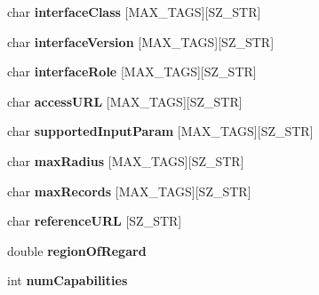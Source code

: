 \begin{CompactItemize}
\item 
\hypertarget{structVOTResource_93f36922abc2d98064ad63654ab25a7c}{
char \textbf{interfaceClass} \mbox{[}MAX\_\-TAGS\mbox{]}\mbox{[}SZ\_\-STR\mbox{]}}
\label{structVOTResource_93f36922abc2d98064ad63654ab25a7c}

\item 
\hypertarget{structVOTResource_c6d4a66929b63c1982069caf11cffca8}{
char \textbf{interfaceVersion} \mbox{[}MAX\_\-TAGS\mbox{]}\mbox{[}SZ\_\-STR\mbox{]}}
\label{structVOTResource_c6d4a66929b63c1982069caf11cffca8}

\item 
\hypertarget{structVOTResource_99676c07ab4b8f41a95337038708f368}{
char \textbf{interfaceRole} \mbox{[}MAX\_\-TAGS\mbox{]}\mbox{[}SZ\_\-STR\mbox{]}}
\label{structVOTResource_99676c07ab4b8f41a95337038708f368}

\item 
\hypertarget{structVOTResource_f41c2b3c49e891e0e3cf680f2ce9bedd}{
char \textbf{accessURL} \mbox{[}MAX\_\-TAGS\mbox{]}\mbox{[}SZ\_\-STR\mbox{]}}
\label{structVOTResource_f41c2b3c49e891e0e3cf680f2ce9bedd}

\item 
\hypertarget{structVOTResource_89b1ea26b2525910d0f2844d9abf3085}{
char \textbf{supportedInputParam} \mbox{[}MAX\_\-TAGS\mbox{]}\mbox{[}SZ\_\-STR\mbox{]}}
\label{structVOTResource_89b1ea26b2525910d0f2844d9abf3085}

\item 
\hypertarget{structVOTResource_2e0ccaca6a26587f5581c45b3db41416}{
char \textbf{maxRadius} \mbox{[}MAX\_\-TAGS\mbox{]}\mbox{[}SZ\_\-STR\mbox{]}}
\label{structVOTResource_2e0ccaca6a26587f5581c45b3db41416}

\item 
\hypertarget{structVOTResource_57f404e09b1317476d94608abc7c23b7}{
char \textbf{maxRecords} \mbox{[}MAX\_\-TAGS\mbox{]}\mbox{[}SZ\_\-STR\mbox{]}}
\label{structVOTResource_57f404e09b1317476d94608abc7c23b7}

\item 
\hypertarget{structVOTResource_0818080a3087ba4d8a9f3b7b6ee733c1}{
char \textbf{referenceURL} \mbox{[}SZ\_\-STR\mbox{]}}
\label{structVOTResource_0818080a3087ba4d8a9f3b7b6ee733c1}

\item 
\hypertarget{structVOTResource_6865448f8b121a75e1ccf0830c1c6cbe}{
double \textbf{regionOfRegard}}
\label{structVOTResource_6865448f8b121a75e1ccf0830c1c6cbe}

\item 
\hypertarget{structVOTResource_24008cd9ae4fa5aba5587c43e26fd2de}{
int \textbf{numCapabilities}}
\label{structVOTResource_24008cd9ae4fa5aba5587c43e26fd2de}


\end{CompactItemize}
